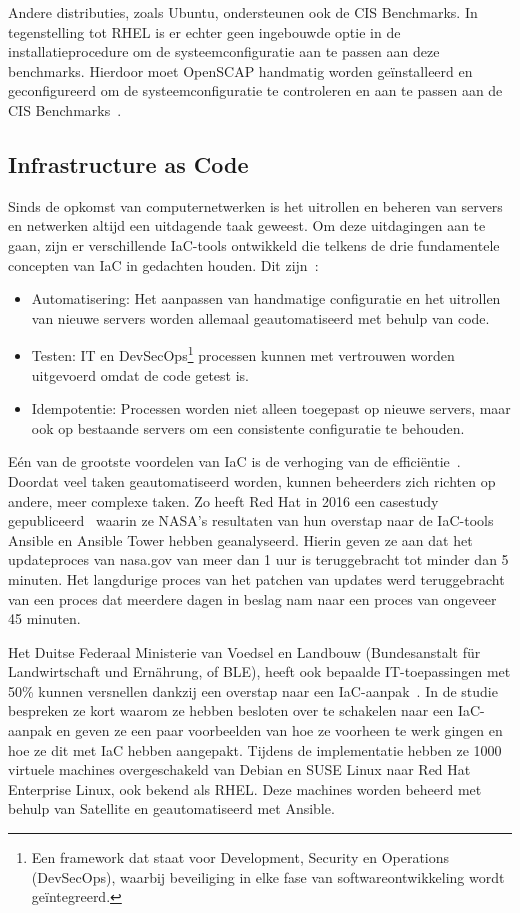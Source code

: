 Andere distributies, zoals Ubuntu, ondersteunen ook de CIS Benchmarks.
In tegenstelling tot RHEL is er echter geen ingebouwde optie in de installatieprocedure om de systeemconfiguratie aan te passen aan deze benchmarks.
Hierdoor moet OpenSCAP handmatig worden ge\"installeerd en geconfigureerd om de systeemconfiguratie te controleren en aan te passen aan de CIS Benchmarks~\autocite{open-scap}.

\subsection{Infrastructure as Code}%
\label{sub:iac}

Sinds de opkomst van computernetwerken is het uitrollen en beheren van servers en netwerken altijd een uitdagende taak geweest.
Om deze uitdagingen aan te gaan, zijn er verschillende IaC-tools ontwikkeld die telkens de drie fundamentele concepten van IaC in gedachten houden.
Dit zijn~\autocite{chef-what-is-iac}:
\begin{itemize}
    \item Automatisering: Het aanpassen van handmatige configuratie en het uitrollen van nieuwe servers worden allemaal geautomatiseerd met behulp van code.
    \item Testen: IT en DevSecOps\footnote{Een framework dat staat voor Development, Security en Operations (DevSecOps), waarbij beveiliging in elke fase van softwareontwikkeling wordt ge\"integreerd.} processen kunnen met vertrouwen worden uitgevoerd omdat de code getest is.
    \item Idempotentie: Processen worden niet alleen toegepast op nieuwe servers, maar ook op bestaande servers om een consistente configuratie te behouden.
\end{itemize}

E\'en van de grootste voordelen van IaC is de verhoging van de effici\"entie~\autocite{splunk-benefits-iac}.
Doordat veel taken geautomatiseerd worden, kunnen beheerders zich richten op andere, meer complexe taken.
Zo heeft Red Hat in 2016 een casestudy gepubliceerd~\autocite{redhat2016nasa} waarin ze NASA's resultaten van hun overstap naar de IaC-tools Ansible en Ansible Tower hebben geanalyseerd.
Hierin geven ze aan dat het updateproces van nasa.gov van meer dan 1 uur is teruggebracht tot minder dan 5 minuten.
Het langdurige proces van het patchen van updates werd teruggebracht van een proces dat meerdere dagen in beslag nam naar een proces van ongeveer 45 minuten.

Het Duitse Federaal Ministerie van Voedsel en Landbouw (Bundesanstalt f\"ur Landwirtschaft und Ern\"ahrung, of BLE), heeft ook bepaalde IT-toepassingen met 50\% kunnen versnellen dankzij een overstap naar een IaC-aanpak~\autocite{redhat2018ansible}.
In de studie bespreken ze kort waarom ze hebben besloten over te schakelen naar een IaC-aanpak en geven ze een paar voorbeelden van hoe ze voorheen te werk gingen en hoe ze dit met IaC hebben aangepakt.
Tijdens de implementatie hebben ze 1000 virtuele machines overgeschakeld van Debian en SUSE Linux naar Red Hat Enterprise Linux, ook bekend als RHEL.
Deze machines worden beheerd met behulp van Satellite en geautomatiseerd met Ansible.

